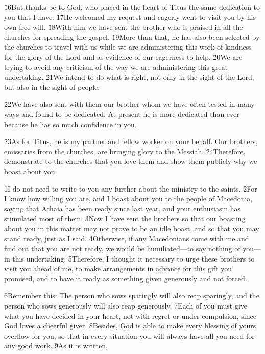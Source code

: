 \v{16}But thanks be to God, who placed in the heart of Titus the same dedication to you that I have. \v{17}He welcomed my request and eagerly went to visit you by his own free will. \v{18}With him we have sent the brother who is praised in all the churches for spreading the gospel. \v{19}More than that, he has also been selected by the churches to travel with us while we are administering this work of kindness for the glory of the Lord and as evidence of our eagerness to help. \v{20}We are trying to avoid any criticism of the way we are administering this great undertaking. \v{21}We intend to do what is right, not only in the sight of the Lord, but also in the sight of people.

\v{22}We have also sent with them our brother whom we have often tested in many ways and found to be dedicated. At present he is more dedicated than ever because he has so much confidence in you.

\v{23}As for Titus, he is my partner and fellow worker on your behalf. Our brothers, emissaries from the churches, are bringing glory to the Messiah. \v{24}Therefore, demonstrate to the churches that you love them and show them publicly why we boast about you.

\v{1}I do not need to write to you any further about the ministry to the saints. \v{2}For I know how willing you are, and I boast about you to the people of Macedonia, saying that Achaia has been ready since last year, and your enthusiasm has stimulated most of them. \v{3}Now I have sent the brothers so that our boasting about you in this matter may not prove to be an idle boast, and so that you may stand ready, just as I said. \v{4}Otherwise, if any Macedonians come with me and find out that you are not ready, we would be humiliated---to say nothing of you---in this undertaking. \v{5}Therefore, I thought it necessary to urge these brothers to visit you ahead of me, to make arrangements in advance for this gift you promised, and to have it ready as something given generously and not forced.

\v{6}Remember this: The person who sows sparingly will also reap sparingly, and the person who sows generously will also reap generously. \v{7}Each of you must give what you have decided in your heart, not with regret or under compulsion, since God loves a cheerful giver. \v{8}Besides, God is able to make every blessing of yours overflow for you, so that in every situation you will always have all you need for any good work. \v{9}As it is written,

